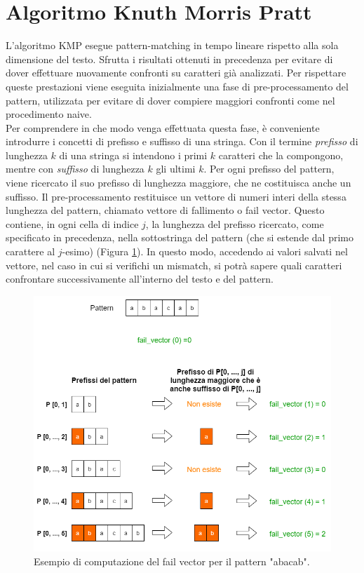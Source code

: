 \section{Algoritmo Knuth Morris Pratt}\label{KMP}
L'algoritmo KMP esegue pattern-matching in tempo lineare rispetto alla sola dimensione del testo. 
Sfrutta i risultati ottenuti in precedenza per evitare di dover effettuare nuovamente confronti su caratteri già analizzati. Per rispettare queste prestazioni viene eseguita inizialmente una fase di pre-processamento del pattern, utilizzata per evitare di dover compiere maggiori confronti come nel procedimento naive\cite{func}.\\ Per comprendere in che modo venga effettuata questa fase, è conveniente introdurre i concetti di prefisso e suffisso di una stringa.
Con il termine {\itshape prefisso} di lunghezza $k$  di una stringa si intendono i primi $k$ caratteri che la compongono, mentre con {\itshape suffisso} di lunghezza $k$ gli ultimi $k$.
Per ogni prefisso del pattern, viene ricercato il suo prefisso di lunghezza maggiore, che ne costituisca anche un suffisso. Il pre-processamento restituisce un vettore di numeri interi della stessa lunghezza del pattern, chiamato vettore di fallimento o fail vector. Questo contiene, in ogni cella di indice $j$, la lunghezza del prefisso ricercato, come specificato in precedenza, nella sottostringa del pattern (che si estende dal primo carattere al $j$-esimo) (Figura \ref{esempio_fail}). In questo modo, accedendo ai valori salvati nel vettore, nel caso in cui si verifichi un mismatch, si potrà sapere quali caratteri confrontare successivamente all'interno del testo e del pattern.
\begin{figure}[h]
\centering
\includegraphics[scale=0.6, angle=0]{./Images/Chapters/Esempio_Fail}
\caption{\footnotesize{Esempio di computazione del fail vector per il pattern "abacab".}}
\label{esempio_fail}
\end{figure}
